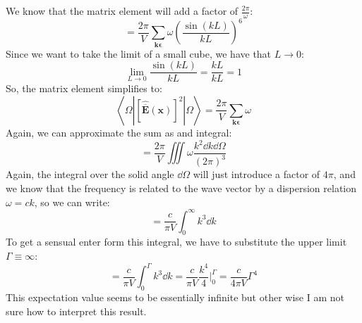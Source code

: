 \documentclass[12pt]{article}
\begin{document}
We know that the matrix element will add a factor of $\frac{2\pi}{\omega }$:
\begin{equation}
  = \frac{2\pi}{V} \sum_{\mathbf{k} \boldsymbol{\epsilon}}\omega \left(\frac{\sin(kL)}{kL}\right)^6
\end{equation}
Since we want to take the limit of a small cube, we have that $L \rightarrow 0$:
\begin{equation}
  \lim_{L \rightarrow 0}\frac{\sin(kL)}{kL} =\frac{kL}{kL} = 1
\end{equation}
So, the matrix element simplifies to:
\begin{equation}
  \left\langle\Omega\left|[\hat{\overline{\mathbf{E}}}(\mathbf{x})]^{2}\right| \Omega\right\rangle = \frac{2\pi}{V} \sum_{\mathbf{k} \boldsymbol{\epsilon}}\omega
\end{equation}
Again, we can approximate the sum as and integral:
\begin{equation}
  = \frac{2\pi}{V}\iiint \omega \frac{k^{2} \dd{k}\dd{\Omega}}{(2\pi)^3}
\end{equation}
Again, the integral over the solid angle $\dd{\Omega}$ will just introduce a factor of $4\pi$, and we know that the frequency is related to the wave vector by a dispersion relation $\omega = ck$, so we can write:
\begin{equation}
  = \frac{ c}{\pi V}\int_{0}^{\infty } k^3 \dd{k}
\end{equation}
To get a sensual enter form this integral, we have to substitute the upper limit $\Gamma \equiv \infty$:
\begin{equation}
  = \frac{ c}{\pi V}\int_{0}^{\Gamma } k^3 \dd{k} = \frac{ c}{\pi V}\frac{k^4}{4}\Bigg|_{0}^{\Gamma} = \frac{ c}{4\pi V}\Gamma^4
\end{equation}
This expectation value seems to be essentially infinite but other wise I am not sure how to interpret this result.
\end{document}

